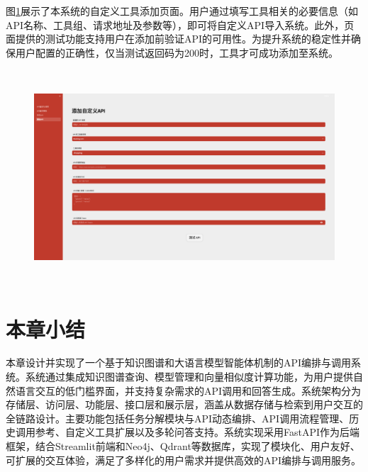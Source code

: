 图\ref{fig:ch6-add-tool}展示了本系统的自定义工具添加页面。用户通过填写工具相关的必要信息（如API名称、工具组、请求地址及参数等），即可将自定义API导入系统。此外，页面提供的测试功能支持用户在添加前验证API的可用性。为提升系统的稳定性并确保用户配置的正确性，仅当测试返回码为200时，工具才可成功添加至系统。

\begin{figure}[H]
  \vspace{1em}
  \centering
  \setlength{\abovecaptionskip}{10pt} %
  \includegraphics[height=8cm]{../assets/ch6-添加自定义API.png}
  \label{fig:ch6-add-tool}
\end{figure}

\section{本章小结}

本章设计并实现了一个基于知识图谱和大语言模型智能体机制的API编排与调用系统。系统通过集成知识图谱查询、模型管理和向量相似度计算功能，为用户提供自然语言交互的低门槛界面，并支持复杂需求的API调用和回答生成。系统架构分为存储层、访问层、功能层、接口层和展示层，涵盖从数据存储与检索到用户交互的全链路设计。主要功能包括任务分解模块与API动态编排、API调用流程管理、历史调用参考、自定义工具扩展以及多轮问答支持。系统实现采用FastAPI作为后端框架，结合Streamlit前端和Neo4j、Qdrant等数据库，实现了模块化、用户友好、可扩展的交互体验，满足了多样化的用户需求并提供高效的API编排与调用服务。